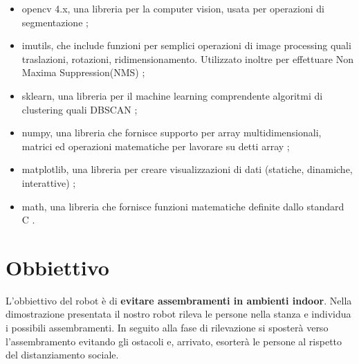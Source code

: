 \documentclass[a4paper]{article}
\begin{document}
	\begin{itemize}
		\item opencv 4.x, una libreria per la computer vision, usata per operazioni di segmentazione \cite{opencv};
		\item imutils, che include funzioni per semplici operazioni di image processing quali traslazioni, rotazioni, ridimensionamento. Utilizzato inoltre per effettuare Non Maxima Suppression(NMS) \cite{imutils};
		\item sklearn, una libreria per il machine learning comprendente algoritmi di clustering quali DBSCAN \cite{scikit};
		\item numpy, una libreria che fornisce supporto per array multidimensionali, matrici ed operazioni matematiche per lavorare su detti array \cite{numpy};
		\item matplotlib, una libreria per creare visualizzazioni di dati (statiche, dinamiche, interattive) \cite{matplotlib};
		\item math, una libreria che fornisce funzioni matematiche definite dallo standard C \cite{math}.
	\end{itemize}

	\section{Obbiettivo}\label{sec:Obbiettivo} 
	L'obbiettivo del robot è di \textbf{evitare assembramenti in ambienti indoor}. \newline
	Nella dimostrazione presentata il nostro robot rileva le persone nella stanza e individua i possibili assembramenti. In seguito alla fase di rilevazione si sposterà verso l'assembramento evitando gli ostacoli e, arrivato, esorterà le persone al rispetto del distanziamento sociale.
	
\end{document}
